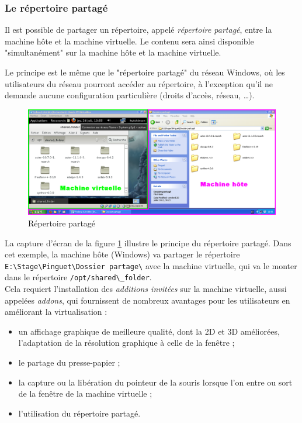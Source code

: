 
\subsubsection{Le répertoire partagé}
\label{Le répertoire partagé}

Il est possible de partager un répertoire, appelé \textit{répertoire partagé}, entre la machine hôte et la machine virtuelle.
Le contenu sera ainsi disponible "simultanément" sur la machine hôte et la machine virtuelle.

Le principe est le même que le "répertoire partagé" du réseau Windows, où les utilisateurs du réseau pourront accéder au répertoire, à l'exception qu'il ne demande aucune configuration particulière (droits d'accès, réseau, \ldots).
\\


\begin{figure}[!h]
	\center
	\includegraphics[scale=0.35]{img/Repertoire_partage.png}
	\caption{Répertoire partagé}
	\label{Screenshot Répertoire partagé}
\end{figure}

La capture d'écran de la figure \ref{Screenshot Répertoire partagé} illustre le principe du répertoire partagé.
Dans cet exemple, la machine hôte (Windows) va partager le répertoire \lstinline{E:\Stage\Pinguet\Dossier partage\} avec la machine virtuelle, qui va le monter dans le répertoire \lstinline{/opt/shared\_folder}.
\\


Cela requiert l'installation des \textit{additions invitées} sur la machine virtuelle, aussi appelées \textit{addons}, qui fournissent de nombreux avantages pour les utilisateurs en améliorant la virtualisation :
\begin{itemize}
	\item un affichage graphique de meilleure qualité, dont la 2D et 3D améliorées, l'adaptation de la résolution graphique à celle de la fenêtre ;
	\item le partage du presse-papier ;
	\item la capture ou la libération du pointeur de la souris lorsque l'on entre ou sort de la fenêtre de la machine virtuelle ;
	\item l'utilisation du répertoire partagé.
\\
\end{itemize}





